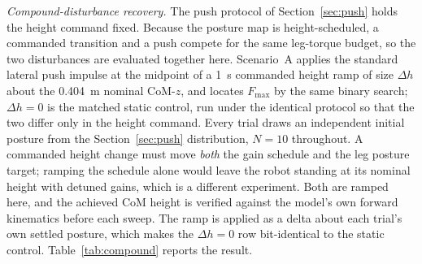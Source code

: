 \documentclass[a4paper,fleqn]{cas-dc}
\begin{document}
\emph{Compound-disturbance recovery.}
The push protocol of Section~\ref{sec:push} holds the height command fixed. Because
the posture map is height-scheduled, a commanded transition and a push compete
for the same leg-torque budget, so the two disturbances are evaluated together
here. Scenario~A applies the standard lateral push impulse at the midpoint of a
\SI{1}{s} commanded height ramp of size $\Delta h$ about the \SI{0.404}{m}
nominal CoM-$z$, and locates $F_{\max}$ by the same binary search; $\Delta h{=}0$
is the matched static control, run under the identical protocol so that the two
differ only in the height command. Every trial draws an independent initial
posture from the Section~\ref{sec:push} distribution, $N{=}10$ throughout.
A commanded height change must move \emph{both} the gain schedule and the leg
posture target; ramping the schedule alone would leave the robot standing at its
nominal height with detuned gains, which is a different experiment. Both are
ramped here, and the achieved CoM height is verified against the model's own
forward kinematics before each sweep. The ramp is applied as a delta about each
trial's own settled posture, which makes the $\Delta h{=}0$ row bit-identical to
the static control.
Table~\ref{tab:compound} reports the result.
\end{document}
